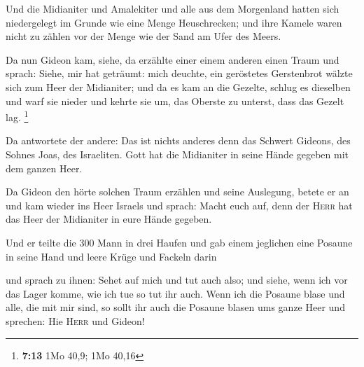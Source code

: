  Und die Midianiter und Amalekiter und alle aus dem
Morgenland hatten sich niedergelegt im Grunde wie eine Menge
Heuschrecken; und ihre Kamele waren nicht zu zählen vor der Menge wie
der Sand am Ufer des Meers.

 Da nun Gideon kam, siehe, da erzählte einer einem
anderen einen Traum und sprach: Siehe, mir hat geträumt: mich deuchte,
ein geröstetes Gerstenbrot wälzte sich zum Heer der Midianiter; und da
es kam an die Gezelte, schlug es dieselben und warf sie nieder und
kehrte sie um, das Oberste zu unterst, dass das Gezelt lag. \footnote{\textbf{7:13}
  1Mo 40,9; 1Mo 40,16}

 Da antwortete der andere: Das ist nichts anderes denn
das Schwert Gideons, des Sohnes Joas, des Israeliten. Gott hat die
Midianiter in seine Hände gegeben mit dem ganzen Heer.

 Da Gideon den hörte solchen Traum erzählen und seine
Auslegung, betete er an und kam wieder ins Heer Israels und sprach:
Macht euch auf, denn der \textsc{Herr} hat das Heer der Midianiter in
eure Hände gegeben.

 Und er teilte die 300 Mann in drei Haufen und gab einem
jeglichen eine Posaune in seine Hand und leere Krüge und Fackeln darin

 und sprach zu ihnen: Sehet auf mich und tut auch also;
und siehe, wenn ich vor das Lager komme, wie ich tue so tut ihr auch.
 Wenn ich die Posaune blase und alle, die mit mir sind,
so sollt ihr auch die Posaune blasen ums ganze Heer und sprechen: Hie
\textsc{Herr} und Gideon!

